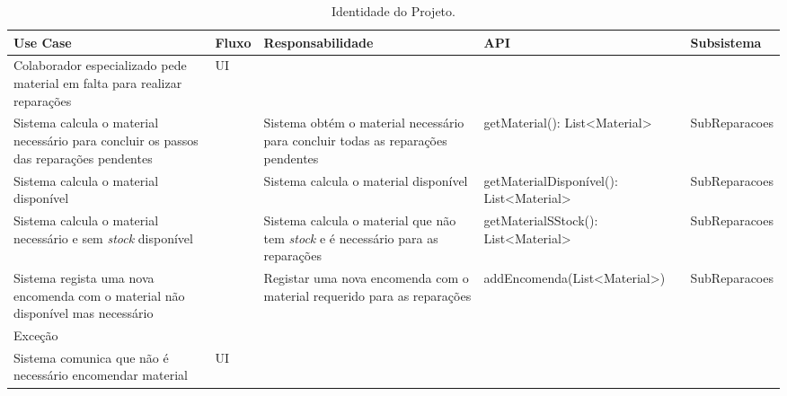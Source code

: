 \documentclass[../relatorio.tex]{subfiles}
\begin{document}
\begin{landscape}
    \begin{table}[!h]
        \centering
        \begin{tabular}{|p{5cm}|p{1cm}|p{4cm}|p{6cm}|p{3cm}|}
            \hline
            \rowcolor{gray!20!white}
            Use Case & Fluxo & Responsabilidade & API & Subsistema \\
            \hline
            \rowcolor{yellow}
            Colaborador especializado pede material em falta para realizar reparações
                     & UI
                     &
                     &
                     &
            \\
            \hline
            Sistema calcula o material necessário para concluir os passos das reparações pendentes
                     &
                     & Sistema obtém o material necessário para concluir todas as reparações pendentes
                     & getMaterial(): List<Material>
                     & SubReparacoes
            \\
            \hline
            Sistema calcula o material disponível
                     &
                     & Sistema calcula o material disponível
                     & getMaterialDisponível(): List<Material>
                     & SubReparacoes
            \\
            \hline
            Sistema calcula o material necessário e sem \textit{stock} disponível
                     &
                     & Sistema calcula o material que não tem \textit{stock} e é necessário para as reparações
                     & getMaterialSStock(): List<Material>
                     & SubReparacoes
            \\
            \hline
            Sistema regista uma nova encomenda com o material não disponível mas necessário
                     &
                     & Registar uma nova encomenda com o material requerido para as reparações	
                     & addEncomenda(List<Material>)
                     & SubReparacoes
            \\
            \hline
            \rowcolor{red!30}
            Exceção  &   &   &    & \\
            \hline
            \rowcolor{yellow}
            Sistema comunica que não é necessário encomendar material
                    & UI
                    &
                    &
                    &
            \\
            \hline
        \end{tabular}
        \caption{Identidade do Projeto.}
    \end{table}
\end{landscape}
\end{document}
